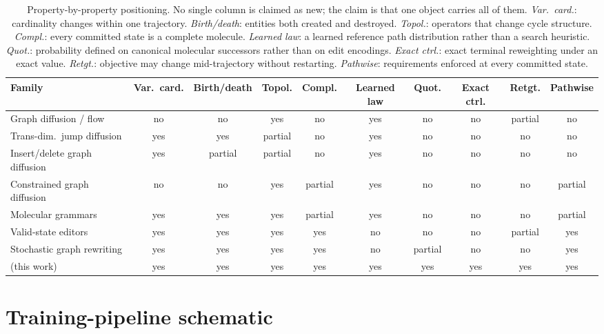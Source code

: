 \begin{table}[h]
\centering
\scriptsize
\setlength{\tabcolsep}{3pt}
\caption{Property-by-property positioning. No single column is claimed as new; the claim is that one object carries all of them. \emph{Var.\ card.}: cardinality changes within one trajectory. \emph{Birth/death}: entities both created and destroyed. \emph{Topol.}: operators that change cycle structure. \emph{Compl.}: every committed state is a complete molecule. \emph{Learned law}: a learned reference path distribution rather than a search heuristic. \emph{Quot.}: probability defined on canonical molecular successors rather than on edit encodings. \emph{Exact ctrl.}: exact terminal reweighting under an exact value. \emph{Retgt.}: objective may change mid-trajectory without restarting. \emph{Pathwise}: requirements enforced at every committed state.}
\label{tab:positioning}
\begin{tabular*}{\textwidth}{@{\extracolsep{\fill}}lccccccccc}
\toprule
Family & Var.\ card. & Birth/death & Topol. & Compl. & Learned law & Quot. & Exact ctrl. & Retgt. & Pathwise\\
\midrule
Graph diffusion / flow        & no  & no  & yes & no      & yes & no      & no  & partial & no\\
Trans-dim.\ jump diffusion    & yes & yes & partial & no  & yes & no      & no  & no      & no\\
Insert/delete graph diffusion & yes & partial & partial & no & yes & no  & no  & no      & no\\
Constrained graph diffusion   & no  & no  & yes & partial & yes & no      & no  & no      & partial\\
Molecular grammars            & yes & yes & yes & partial & yes & no      & no  & no      & partial\\
Valid-state editors           & yes & yes & yes & yes     & no  & no      & no  & partial & yes\\
Stochastic graph rewriting    & yes & yes & yes & yes     & no  & partial & no  & no      & yes\\
\midrule
\method{} (this work)         & yes & yes & yes & yes     & yes & yes     & yes & yes     & yes\\
\bottomrule
\end{tabular*}
\end{table}

\section{Training-pipeline schematic}
\label{app:fig2}

